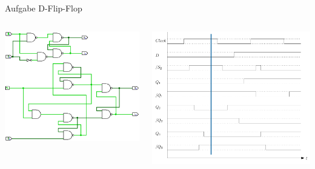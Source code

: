 \begin{frame}{Aufgabe \thesection}{D-Flip-Flop}
  \begin{solutionnoinc}
    \begin{columns}
      \begin{column}{0.5\textwidth}
        \includegraphics[height=0.5\paperheight, center]{./figures/comparison100.png}
      \end{column}
      \begin{column}{0.5\textwidth}
        \includegraphics[height=0.5\paperheight, center]{./figures/timing_diagram_2.png}
      \end{column}
    \end{columns}
  \end{solutionnoinc}
\end{frame}

